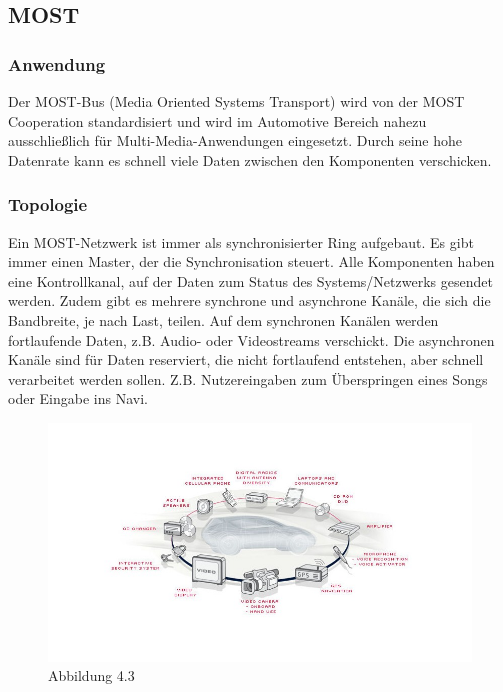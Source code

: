 \subsection{MOST}		
\subsubsection{Anwendung}
Der MOST-Bus (Media Oriented Systems Transport) wird von der MOST Cooperation standardisiert und wird im Automotive Bereich nahezu ausschließlich für Multi-Media-Anwendungen eingesetzt. Durch seine hohe Datenrate kann es schnell viele Daten zwischen den Komponenten verschicken.

\cite{.MH_Vehicle}

\subsubsection{Topologie}
Ein MOST-Netzwerk ist immer als synchronisierter Ring aufgebaut. Es gibt immer einen Master, der die Synchronisation steuert. Alle Komponenten haben eine Kontrollkanal, auf der Daten zum Status des Systems/Netzwerks gesendet werden. Zudem gibt es mehrere synchrone und asynchrone Kanäle, die sich die Bandbreite, je nach Last, teilen.
Auf dem synchronen Kanälen werden fortlaufende Daten, z.B. Audio- oder Videostreams verschickt.
Die asynchronen Kanäle sind für Daten reserviert, die nicht fortlaufend entstehen, aber schnell verarbeitet werden sollen. Z.B. Nutzereingaben zum Überspringen eines Songs oder Eingabe ins Navi.

\cite{.BP01}

\begin{figure}[h!]
	\includegraphics[width=\linewidth]{most_ring.jpg}
	\caption{Abbildung 4.3}
\end{figure}

